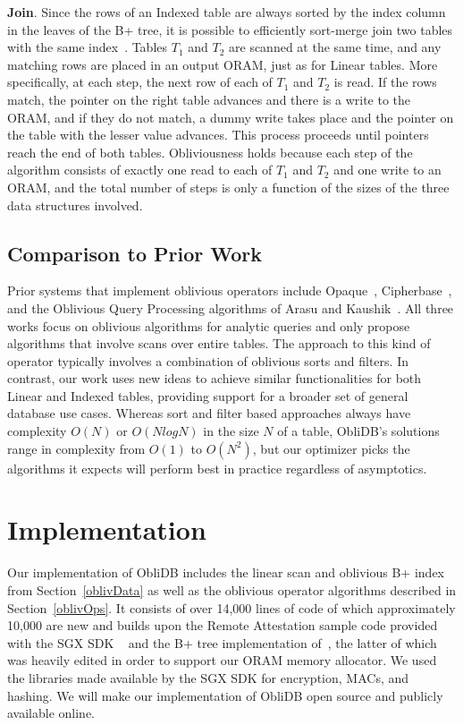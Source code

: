 \documentclass[letterpaper,twocolumn,10pt]{article}
\def\name/{ObliDB}
\begin{document}
  \noindent \textbf{Join}.
  Since the rows of an Indexed table are always sorted by the index column in the leaves of the B+ tree, it is possible to efficiently sort-merge join two tables with the same index~\cite{EN10}. Tables $T_1$ and $T_2$ are scanned at the same time, and any matching rows are placed in an output ORAM, just as for Linear tables. More specifically, at each step, the next row of each of $T_1$ and $T_2$ is read. If the rows match, the pointer on the right table advances and there is a write to the ORAM, and if they do not match, a dummy write takes place and the pointer on the table with the lesser value advances. This process proceeds until pointers reach the end of both tables. Obliviousness holds because each step of the algorithm consists of exactly one read to each of $T_1$ and $T_2$ and one write to an ORAM, and the total number of steps is only a function of the sizes of the three data structures involved.
  
\subsection{Comparison to Prior Work}
Prior systems that implement oblivious operators include Opaque~\cite{ZDB+17}, Cipherbase~\cite{cipherbase}, and the Oblivious Query Processing algorithms of Arasu and Kaushik~\cite{AK14}. All three works focus on oblivious algorithms for analytic queries and only propose algorithms that involve scans over entire tables. The approach to this kind of operator typically involves a combination of oblivious sorts and filters. In contrast, our work uses new ideas to achieve similar functionalities for both Linear and Indexed tables, providing support for a broader set of general database use cases. Whereas sort and filter based approaches always have complexity $O(N)$ or $O(N\textit{log}N)$ in the size $N$ of a table, \name/'s solutions range in complexity from $O(1)$ to $O(N^2)$, but our optimizer picks the algorithms it expects will perform best in practice regardless of asymptotics. 

\section{Implementation}\label{imp}
Our implementation of \name/ includes the linear scan and oblivious B+ index from Section~\ref{oblivData} as well as the oblivious operator algorithms described in Section~\ref{oblivOps}. It consists of over 14,000 lines of code of which approximately 10,000 are new and builds upon the Remote Attestation sample code provided with the SGX SDK ~\cite{SGXRef} and the B+ tree implementation of~\cite{BPlus}, the latter of which was heavily edited in order to support our ORAM memory allocator. We used the libraries made available by the SGX SDK for encryption, MACs, and hashing. We will make our implementation of \name/ open source and publicly available online. 
\end{document}
